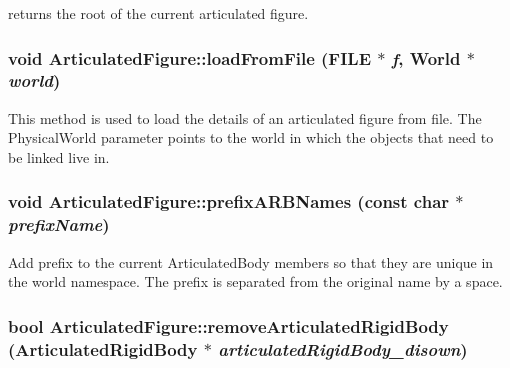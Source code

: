returns the root of the current articulated figure. \hypertarget{classCartWheel_1_1Physics_1_1ArticulatedFigure_a8363fbd6e6894c3bbbbf05e68a6f9c30}{
\subsubsection[{loadFromFile}]{\setlength{\rightskip}{0pt plus 5cm}void ArticulatedFigure::loadFromFile (FILE $\ast$ {\em f}, \/  {\bf World} $\ast$ {\em world})}}
\label{classCartWheel_1_1Physics_1_1ArticulatedFigure_a8363fbd6e6894c3bbbbf05e68a6f9c30}
This method is used to load the details of an articulated figure from file. The PhysicalWorld parameter points to the world in which the objects that need to be linked live in. \hypertarget{classCartWheel_1_1Physics_1_1ArticulatedFigure_abc0037a8a62028a4d13746e8d7a6f212}{
\subsubsection[{prefixARBNames}]{\setlength{\rightskip}{0pt plus 5cm}void ArticulatedFigure::prefixARBNames (const char $\ast$ {\em prefixName})}}
\label{classCartWheel_1_1Physics_1_1ArticulatedFigure_abc0037a8a62028a4d13746e8d7a6f212}
Add prefix to the current ArticulatedBody members so that they are unique in the world namespace. The prefix is separated from the original name by a space. \hypertarget{classCartWheel_1_1Physics_1_1ArticulatedFigure_ab21efa212cafec6ed5d1ae47bae2c059}{
\subsubsection[{removeArticulatedRigidBody}]{\setlength{\rightskip}{0pt plus 5cm}bool ArticulatedFigure::removeArticulatedRigidBody ({\bf ArticulatedRigidBody} $\ast$ {\em articulatedRigidBody\_\-disown})}}
